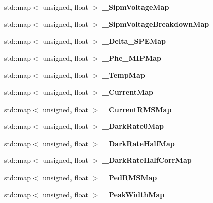 \begin{DoxyCompactItemize}
\item 
std::map$<$ unsigned, float $>$ {\bfseries \_\-SipmVoltageMap}\label{classCALICE_1_1SiPmPropertiesProcessor_a63365171f3bf33d2134b1897875cba83}

\item 
std::map$<$ unsigned, float $>$ {\bfseries \_\-SipmVoltageBreakdownMap}\label{classCALICE_1_1SiPmPropertiesProcessor_abebd280f89c688a481b501a4510c435b}

\item 
std::map$<$ unsigned, float $>$ {\bfseries \_\-Delta\_\-SPEMap}\label{classCALICE_1_1SiPmPropertiesProcessor_a2b53b09013432289bbf15a422b10b599}

\item 
std::map$<$ unsigned, float $>$ {\bfseries \_\-Phe\_\-MIPMap}\label{classCALICE_1_1SiPmPropertiesProcessor_a587b49d56165a88a3938f7fd26b82110}

\item 
std::map$<$ unsigned, float $>$ {\bfseries \_\-TempMap}\label{classCALICE_1_1SiPmPropertiesProcessor_af04cc739127d761f2b1ae305b574cdb3}

\item 
std::map$<$ unsigned, float $>$ {\bfseries \_\-CurrentMap}\label{classCALICE_1_1SiPmPropertiesProcessor_a3481e547f6872a3b8c61f81f79dd2a57}

\item 
std::map$<$ unsigned, float $>$ {\bfseries \_\-CurrentRMSMap}\label{classCALICE_1_1SiPmPropertiesProcessor_a6650a16201f45447c8f0e1187747ab6a}

\item 
std::map$<$ unsigned, float $>$ {\bfseries \_\-DarkRate0Map}\label{classCALICE_1_1SiPmPropertiesProcessor_a6cb7ed611c785639effe2b6d776fde93}

\item 
std::map$<$ unsigned, float $>$ {\bfseries \_\-DarkRateHalfMap}\label{classCALICE_1_1SiPmPropertiesProcessor_ad8580b0ff0a779571753ae4e7312bad5}

\item 
std::map$<$ unsigned, float $>$ {\bfseries \_\-DarkRateHalfCorrMap}\label{classCALICE_1_1SiPmPropertiesProcessor_a87fcb0172fd11803f6df6d98d4263481}

\item 
std::map$<$ unsigned, float $>$ {\bfseries \_\-PedRMSMap}\label{classCALICE_1_1SiPmPropertiesProcessor_a6a9b968b7530a1395cce90166158ffdb}

\item 
std::map$<$ unsigned, float $>$ {\bfseries \_\-PeakWidthMap}\label{classCALICE_1_1SiPmPropertiesProcessor_aa7a3db0ca5b0c1814fdc1dfdc8a4b69f}


\end{DoxyCompactItemize}
